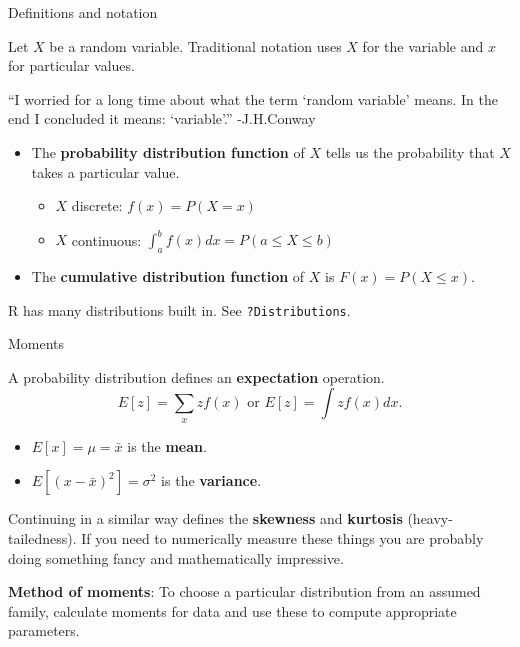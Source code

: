 \documentclass[
  ignorenonframetext,
]{beamer}
\providecommand{\tightlist}{%
  \setlength{\itemsep}{0pt}\setlength{\parskip}{0pt}}
\begin{document}
\begin{frame}[fragile]{Definitions and notation}
\protect\hypertarget{definitions-and-notation-1}{}

Let \(X\) be a random variable. Traditional notation uses \(X\) for the
variable and \(x\) for particular values.

``I worried for a long time about what the term `random variable' means.
In the end I concluded it means: `variable'.'' -J.H.Conway

\begin{itemize}
\tightlist
\item
  The \textbf{probability distribution function} of \(X\) tells us the
  probability that \(X\) takes a particular value.

  \begin{itemize}
  \tightlist
  \item
    \(X\) discrete: \(f(x)=P(X=x)\)
  \item
    \(X\) continuous: \(\int_a^b f(x) dx = P(a\leq X\leq b)\)
  \end{itemize}
\item
  The \textbf{cumulative distribution function} of \(X\) is
  \(F(x)=P(X\leq x)\).
\end{itemize}

R has many distributions built in. See \texttt{?Distributions}.

\end{frame}

\begin{frame}{Moments}
\protect\hypertarget{moments}{}

A probability distribution defines an \textbf{expectation} operation. \[
E[z]=\sum_x z f(x) \text{ or } E[z]=\int z f(x) dx.
\]

\begin{itemize}
\tightlist
\item
  \(E[x]=\mu=\bar x\) is the \textbf{mean}.
\item
  \(E[(x-\bar x)^2]=\sigma^2\) is the \textbf{variance}.
\end{itemize}

Continuing in a similar way defines the \textbf{skewness} and
\textbf{kurtosis} (heavy-tailedness). If you need to numerically measure
these things you are probably doing something fancy and mathematically
impressive.

\textbf{Method of moments}: To choose a particular distribution from an
assumed family, calculate moments for data and use these to compute
appropriate parameters.

\end{frame}
\end{document}
